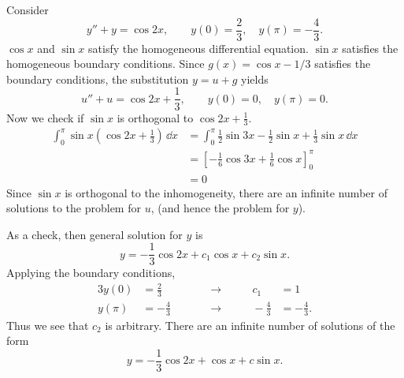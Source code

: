 \begin{Example}
  Consider
  \[ y'' + y = \cos 2x, \qquad y(0) = \frac{2}{3}, \quad y(\pi) = -\frac{4}{3}. \]
  $\cos x$ and $\sin x$ satisfy the homogeneous differential equation.  $\sin x$
  satisfies the homogeneous boundary conditions.
  Since $g(x) = \cos x - 1/3$ satisfies the boundary conditions, the 
  substitution $y = u + g$ yields
  \[
  u'' + u = \cos 2x + \frac{1}{3}, \qquad y(0) = 0, \quad y(\pi) = 0. 
  \]
  Now we check if $\sin x$ is orthogonal to $\cos 2x + \frac{1}{3}$.
  \begin{align*}
    \int_0^\pi \sin x \left( \cos 2x  + \frac{1}{3} \right)\,\dd x
    &= \int_0^\pi \frac{1}{2} \sin 3x - \frac{1}{2} \sin x 
    + \frac{1}{3}\sin x\,\dd x \\
    &= \left[ -\frac{1}{6} \cos 3x + \frac{1}{6} \cos x \right]_0^\pi \\
    &= 0
  \end{align*}
  Since $\sin x$ is orthogonal to the inhomogeneity, there are an infinite 
  number of solutions to the problem for $u$, (and hence the problem for $y$).

  As a check, then general solution for $y$ is
  \[ y = -\frac{1}{3} \cos 2x + c_1 \cos x + c_2 \sin x. \]
  Applying the boundary conditions,
  \begin{alignat*}{3}
    y(0) &= \frac{2}{3} &\qquad &\to &\qquad c_1 &= 1 \\
    y(\pi) &= -\frac{4}{3} &\qquad &\to &\qquad -\frac{4}{3} &= -\frac{4}{3}.
  \end{alignat*}
  Thus we see that $c_2$ is arbitrary.  There are an infinite number of solutions of the
  form
  \[ \boxed{ y = -\frac{1}{3} \cos 2x + \cos x + c \sin x. } \]
\end{Example}


























